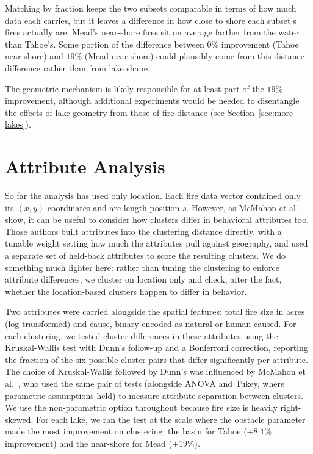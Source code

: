 \documentclass[11pt]{article}
\begin{document}
Matching by fraction keeps the two subsets comparable in terms of how much data each carries, but it leaves a difference in how close to shore each subset's fires actually are. Mead's near-shore fires sit on average farther from the water than Tahoe's. Some portion of the difference between $0\%$ improvement (Tahoe near-shore) and $19\%$ (Mead near-shore) could plausibly come from this distance difference rather than from lake shape.
 
The geometric mechanism is likely responsible for at least part of the $19\%$ improvement, although additional experiments would be needed to disentangle the effects of lake geometry from those of fire distance (see Section~\ref{sec:more-lakes}).

\section{Attribute Analysis}
\label{sec:attributes}
 
So far the analysis has used only location. Each fire data vector contained only its $(x, y)$ coordinates and arc-length position $s$. However, as McMahon et al.~\cite{mcmahon2022} show, it can be useful to consider how clusters differ in behavioral attributes too. Those authors built attributes into the clustering distance directly, with a tunable weight setting how much the attributes pull against geography, and used a separate set of held-back attributes to score the resulting clusters. We do something much lighter here: rather than tuning the clustering to enforce attribute differences, we cluster on location only and check, after the fact, whether the location-based clusters happen to differ in behavior. 

Two attributes were carried alongside the spatial features: total fire size in acres (log-transformed) and cause, binary-encoded as natural or human-caused. For each clustering, we tested cluster differences in these attributes using the Kruskal-Wallis test with Dunn's follow-up and a Bonferroni correction, reporting the fraction of the six possible cluster pairs that differ significantly per attribute. The choice of Kruskal-Wallis followed by Dunn's was influenced by McMahon et al.~\cite{mcmahon2022}, who used the same pair of tests (alongside ANOVA and Tukey, where parametric assumptions held) to measure attribute separation between clusters. We use the non-parametric option throughout because fire size is heavily right-skewed. For each lake, we ran the test at the scale where the obstacle parameter made the most improvement on clustering: the basin for Tahoe ($+8.1\%$ improvement) and the near-shore for Mead ($+19\%$). 
 
\end{document}
